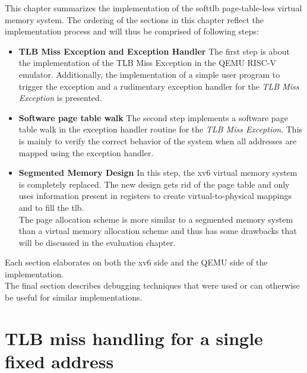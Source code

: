This chapter summarizes the implementation of the softtlb page-table-less virtual memory system.
The ordering of the sections in this chapter reflect the implementation process and will thus
be comprised of following steps:
\begin{itemize}
    \item \textbf{TLB Miss Exception and Exception Handler} The first step is about
          the implementation of the TLB Miss Exception in the QEMU RISC-V emulator. Additionally, the
          implementation of a simple user program to trigger the exception and a rudimentary exception
          handler for the \textit{TLB Miss Exception} is presented.
    \item \textbf{Software page table walk} The second step implements a software page table walk
          in the exception handler routine for the \textit{TLB Miss Exception}. This is mainly
          to verify the correct behavior of the system when all addresses
          are mapped using the exception handler.
    \item \textbf{Segmented Memory Design} In this step, the xv6 virtual memory system is completely
          replaced. The new design gets rid of the page table and only uses information present in
          registers to create virtual-to-physical mappings and to fill the tlb.\\The page allocation
          scheme is more similar to a segmented memory system than a virtual memory allocation scheme
          and thus has some drawbacks that will be discussed in the evaluation chapter.
\end{itemize}
Each section elaborates on both the xv6 side and the QEMU side of the implementation.\\
The final section describes debugging techniques that were used or can otherwise be useful for
similar implementations.



\section{TLB miss handling for a single fixed address}

